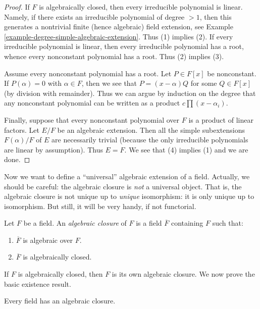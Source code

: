 \begin{proof}
If $F$ is algebraically closed, then every irreducible polynomial is linear.
Namely, if there exists an irreducible polynomial of degree $> 1$, then
this generates a nontrivial finite (hence algebraic) field extension, see
Example \ref{example-degree-simple-algebraic-extension}.
Thus (1) implies (2). If every irreducible polynomial
is linear, then every irreducible polynomial has a root, whence every
nonconstant polynomial has a root. Thus (2) implies (3).

\medskip\noindent
Assume every nonconstant polynomial has a root. Let $P \in F[x]$
be nonconstant. If $P(\alpha) = 0$ with $\alpha \in F$, then we see
that $P = (x - \alpha)Q$ for some $Q \in F[x]$ (by division with remainder).
Thus we can argue by induction on the degree that any nonconstant
polynomial can be written as a product $c \prod (x - \alpha_i)$.

\medskip\noindent
Finally, suppose that every nonconstant polynomial over $F$ is a product of
linear factors. Let $E/F$ be an algebraic extension. Then all the simple
subextensions $F(\alpha)/F$ of $E$ are necessarily trivial (because the
only irreducible polynomials are linear by assumption). Thus $E = F$.
We see that (4) implies (1) and we are done.
\end{proof}

\noindent
Now we want to define a ``universal'' algebraic extension of a field.
Actually, we should be careful: the algebraic closure is {\it not} a
universal object. That is, the algebraic closure is not unique up to
{\it unique} isomorphism: it is only unique up to isomorphism. But still,
it will be very handy, if not functorial.

\begin{definition}
\label{definition-algebraic-closure}
Let $F$ be a field. An {\it algebraic closure} of $F$ is a field
$\overline{F}$ containing $F$ such that:
\begin{enumerate}
\item $\overline{F}$ is algebraic over $F$.
\item $\overline{F}$ is algebraically closed.
\end{enumerate}
\end{definition}

\noindent
If $F$ is algebraically closed, then $F$ is its own algebraic closure.
We now prove the basic existence result.

\begin{theorem}
\label{theorem-existence-algebraic-closure}
Every field has an algebraic closure.
\end{theorem}

